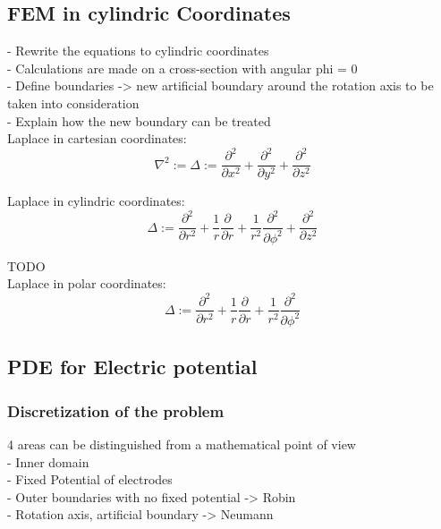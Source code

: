 \documentclass[parskip=half, titlepage=yes, 12pt, BCOR=12mm, DIV=calc]{scrartcl}
\begin{document}
\subsection{FEM in cylindric Coordinates}
- Rewrite the equations to cylindric coordinates \\
- Calculations are made on a cross-section with angular phi = 0 \\
- Define boundaries -> new artificial boundary around the rotation axis to be taken into consideration \\
- Explain how the new boundary can be treated \\
 
Laplace in cartesian coordinates:
\begin{equation}
    \nabla^2 := \Delta := \frac{\partial^2}{\partial x^2} + \frac{\partial^2}{\partial y^2} + \frac{\partial^2}{\partial z^2}
\end{equation}

Laplace in cylindric coordinates:
\begin{equation}
    \Delta := \frac{\partial^2}{\partial r^2} + \frac{1}{r} \frac{\partial}{\partial r} + \frac{1}{r^2} \frac{\partial^2}{\partial \phi^2} + \frac{\partial^2}{\partial z^2}
\end{equation}

TODO \\

Laplace in polar coordinates:
\begin{equation}
    \Delta := \frac{\partial^2}{\partial r^2} + \frac{1}{r} \frac{\partial}{\partial r} + \frac{1}{r^2} \frac{\partial^2}{\partial \phi^2}
\end{equation}



\subsection{PDE for Electric potential}

\subsubsection{Discretization of the problem}
4 areas can be distinguished from a mathematical point of view \\
- Inner domain \\
- Fixed Potential of electrodes \\
- Outer boundaries with no fixed potential -> Robin \\
- Rotation axis, artificial boundary -> Neumann \\
\end{document}
